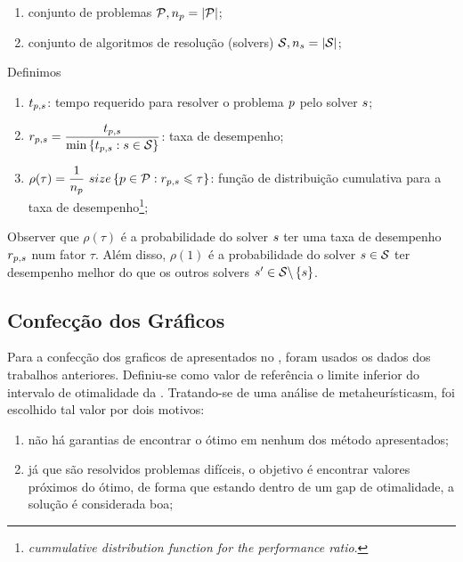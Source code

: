 \begin{enumerate}
    \item conjunto de problemas $\mathcal{P}, n_p = |\mathcal{P}|$;
    \item conjunto de algoritmos de resolução (solvers) $\mathcal{S}, n_s = |\mathcal{S}|$;
\end{enumerate}
Definimos
\begin{enumerate}
    \item $t_{p,s}$: tempo requerido para resolver o problema $p$ pelo solver $s$;
    \item $r_{p,s} = \dfrac{t_{p,s}}{\min\left\{t_{p,s} : s \in \mathcal{S}\right\}}$: taxa de desempenho;
    \item $\rho(\tau) = \dfrac{1}{\nproblem} \ size\Set{\problem \in \problemSet : \performanceratio \leqslant \tau}$: função de distribuição cumulativa para a taxa de desempenho\footnote{\textit{cummulative distribution function for the performance ratio}.};
\end{enumerate}

Observer que $\rho(\tau)$ é a probabilidade do solver $s$ ter uma taxa de desempenho $r_{p,s}$ num fator $\tau$. Além disso, $\rho(1)$ é a probabilidade do solver $s \in \mathcal{S}$ ter desempenho melhor do que os outros solvers $s' \in \mathcal{S}\backslash\left\{s\right\}$.

\subsection{Confecção dos Gráficos \perfprof}
\label{subsubsection:making-perfprof}

Para a confecção dos graficos de \perfprof apresentados no , foram usados os dados dos trabalhos anteriores. Definiu-se como valor de referência o limite inferior do intervalo de otimalidade da . Tratando-se de uma análise de metaheurísticasm, foi escolhido tal valor por dois motivos:

\begin{enumerate}
    \item não há garantias de encontrar o ótimo em nenhum dos método apresentados;
    \item já que são resolvidos problemas difíceis, o objetivo é encontrar valores próximos do ótimo, de forma que estando dentro de um gap de otimalidade, a solução é considerada boa;
\end{enumerate}

